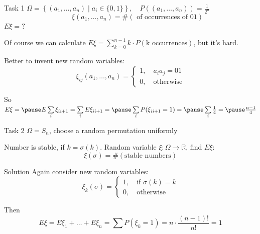 \documentclass[fullscreen=true, bookmarks=true, hyperref={pdfencoding=unicode}]{beamer}
\begin{document}
\begin{frame}{Task 1}
  $\Omega = \left\{(a_1, \dots, a_n)\mid a_i \in \{0,1\} \right\}, \quad P\left((a_1, \dots, a_n)\right) = \frac{1}{2^n}$
  $$\quad\quad \xi(a_1, \dots, a_n) = \#(\text{ of occurrences of 01})$$
  $E\xi = ?$

  \pause
  Of course we can calculate 
  $E\xi = \sum\limits_{k=0}^{n-1} k\cdot P(\text{k occurrences})$, but it's hard.

  \pause
  Better to invent new random variables: 
  $$\xi_{ij}(a_1, \dots, a_n) = 
  \begin{cases}
    1,\quad a_ia_j = 01 \\
    0,\quad \text{otherwise}
  \end{cases}$$

  So $E\xi = \pause E \sum\limits_{i} \xi_{ii+1} = \sum\limits_{i} E \xi_{ii+1} = 
  \pause \sum\limits_{i} P(\xi_{ii+1}=1) = \pause\sum\limits_{i} \frac14 = \pause\frac{n-1}{4}$

\end{frame}


\begin{frame}{Task 2}
  $\Omega = S_n$, choose a random permutation uniformly

  Number is stable, if $k = \sigma(k)$. Random variable $\xi: \Omega \to \mathbb{R}$, find $E\xi$:
  $$\xi(\sigma) = \#(\text{stable numbers}) $$

  \pause
  \begin{block}{Solution}
    Again consider new random variables:
    $$\xi_{k}(\sigma) = 
    \begin{cases}
      1,\quad \text{if } \sigma(k) = k \\
      0,\quad \text{otherwise}
    \end{cases}$$
    
    \pause
    Then $$E\xi = E\xi_1 + \dots + E\xi_n = \sum P(\xi_k = 1) = n\cdot \frac{(n-1)!}{n!} = 1$$
  \end{block}
\end{frame}
\end{document}
